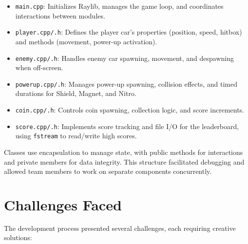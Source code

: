 \documentclass[12pt,a4paper]{article}
\begin{document}
\begin{itemize}
    \item \texttt{main.cpp}: Initializes Raylib, manages the game loop, and coordinates interactions between modules. \\
    \item \texttt{player.cpp/.h}: Defines the player car’s properties (position, speed, hitbox) and methods (movement, power-up activation). \\
    \item \texttt{enemy.cpp/.h}: Handles enemy car spawning, movement, and despawning when off-screen. \\
    \item \texttt{powerup.cpp/.h}: Manages power-up spawning, collision effects, and timed durations for Shield, Magnet, and Nitro. \\
    \item \texttt{coin.cpp/.h}: Controls coin spawning, collection logic, and score increments. \\
    \item \texttt{score.cpp/.h}: Implements score tracking and file I/O for the leaderboard, using \texttt{fstream} to read/write high scores. \\
\end{itemize}

Classes use encapsulation to manage state, with public methods for interactions and private members for data integrity. This structure facilitated debugging and allowed team members to work on separate components concurrently. \\

\section{Challenges Faced}

The development process presented several challenges, each requiring creative solutions: \\
\end{document}
